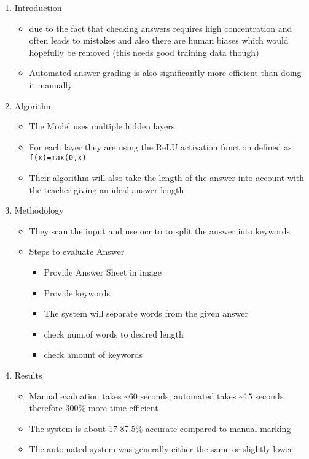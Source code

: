 \documentclass[11pt]{article}
\begin{document}
\begin{enumerate}
\item Introduction
\label{sec:orgdfed9ed}
\begin{itemize}
\item due to the fact that checking answers requires high concentration and often leads to mistakes and also there are human biases which would hopefully be removed (this needs good training data though)
\item Automated answer grading is also significantly more efficient than doing it manually
\end{itemize}
\item Algorithm
\label{sec:org443fb53}
\begin{itemize}
\item The Model uses multiple hidden layers
\item For each layer they are using the ReLU activation function defined as \texttt{f(x)=max(0,x)}
\item Their algorithm will also take the length of the answer into account with the teacher giving an ideal answer length
\end{itemize}
\item Methodology
\label{sec:org8782d90}
\begin{itemize}
\item They scan the input and use ocr to to split the answer into keywords
\item Steps to evaluate Answer
\begin{itemize}
\item Provide Answer Sheet in image
\item Provide keywords
\item The system will separate words from the given answer
\item check num.of words to desired length
\item check amount of keywords
\end{itemize}
\end{itemize}
\item Results
\label{sec:orgbb57a00}
\begin{itemize}
\item Manual exaluation takes \textasciitilde{}60 seconds, automated takes \textasciitilde{}15 seconds therefore 300\% more time efficient
\item The system is about 17-87.5\% accurate compared to manual marking
\item The automated system was generally either the same or slightly lower
\end{itemize}
\end{enumerate}
\end{document}
